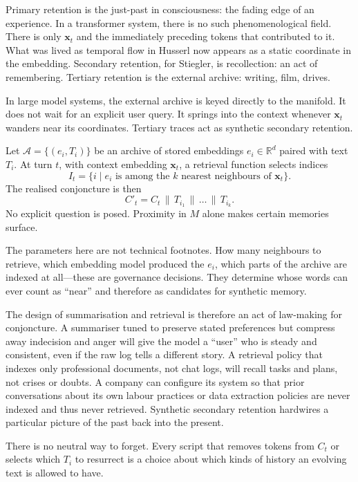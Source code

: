 \documentclass[12pt,a4paper]{article}
\begin{document}
Primary retention is the just-past in consciousness: the fading edge of an experience. In a transformer system, there is no such phenomenological field. There is only $\mathbf{x}_t$ and the immediately preceding tokens that contributed to it. What was lived as temporal flow in Husserl now appears as a static coordinate in the embedding. Secondary retention, for Stiegler, is recollection: an act of remembering. Tertiary retention is the external archive: writing, film, drives.

In large model systems, the external archive is keyed directly to the manifold. It does not wait for an explicit user query. It springs into the context whenever $\mathbf{x}_t$ wanders near its coordinates. Tertiary traces act as synthetic secondary retention.

\begin{formalbox}[title={Synthetic Secondary Retention}]
Let $\mathcal{A} = \{(e_i, T_i)\}$ be an archive of stored embeddings $e_i \in \mathbb{R}^d$ paired with text $T_i$. At turn $t$, with context embedding $\mathbf{x}_t$, a retrieval function selects indices
\[
I_t = \{ i \mid e_i \text{ is among the $k$ nearest neighbours of } \mathbf{x}_t \}.
\]
The realised conjoncture is then
\[
C'_t = C_t \,\|\, T_{i_1} \,\|\, \dots \,\|\, T_{i_k}.
\]
No explicit question is posed. Proximity in $M$ alone makes certain memories surface.
\end{formalbox}

The parameters here are not technical footnotes. How many neighbours to retrieve, which embedding model produced the $e_i$, which parts of the archive are indexed at all---these are governance decisions. They determine whose words can ever count as ``near'' and therefore as candidates for synthetic memory.

The design of summarisation and retrieval is therefore an act of law-making for conjoncture. A summariser tuned to preserve stated preferences but compress away indecision and anger will give the model a ``user'' who is steady and consistent, even if the raw log tells a different story. A retrieval policy that indexes only professional documents, not chat logs, will recall tasks and plans, not crises or doubts. A company can configure its system so that prior conversations about its own labour practices or data extraction policies are never indexed and thus never retrieved. Synthetic secondary retention hardwires a particular picture of the past back into the present.

There is no neutral way to forget. Every script that removes tokens from $C_t$ or selects which $T_i$ to resurrect is a choice about which kinds of history an evolving text is allowed to have.
\end{document}
